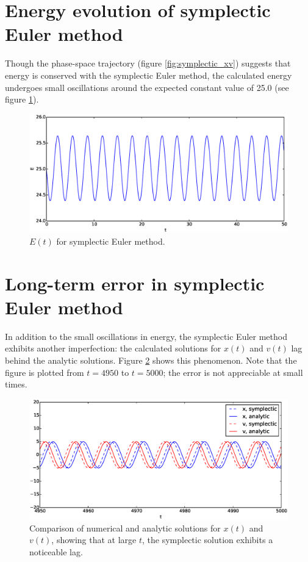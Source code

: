\documentclass{article}
\theoremstyle{definition}
\renewcommand{\>}{\rangle}
\newcommand{\<}{\langle}
\begin{document}
\section{Energy evolution of symplectic Euler method}

Though the phase-space trajectory (figure \ref{fig:symplectic_xv}) suggests that energy
is conserved with the symplectic Euler method, the calculated energy undergoes small
oscillations around the expected constant value of 25.0 (see figure \ref{fig:symplectic_E}).

\begin{figure}
\includegraphics[width=\textwidth]{symplectic_E.eps}
\caption{\label{fig:symplectic_E} $E(t)$ for symplectic Euler method.} 
\end{figure}

\section{Long-term error in symplectic Euler method}

In addition to the small oscillations in energy, the symplectic Euler method exhibits another
imperfection: the calculated solutions for $x(t)$ and $v(t)$ lag behind the analytic solutions.
Figure \ref{fig:symplectic_error} shows this phenomenon. Note that the figure is plotted from
$t=4950$ to $t=5000$; the error is not appreciable at small times.

\begin{figure}[h!]
\includegraphics[width=\textwidth]{symplectic_error.eps}
\caption{\label{fig:symplectic_error} Comparison of numerical and analytic solutions for $x(t)$ and $v(t)$, showing
that at large $t$, the symplectic solution exhibits a noticeable lag.} 
\end{figure}
\end{document}
